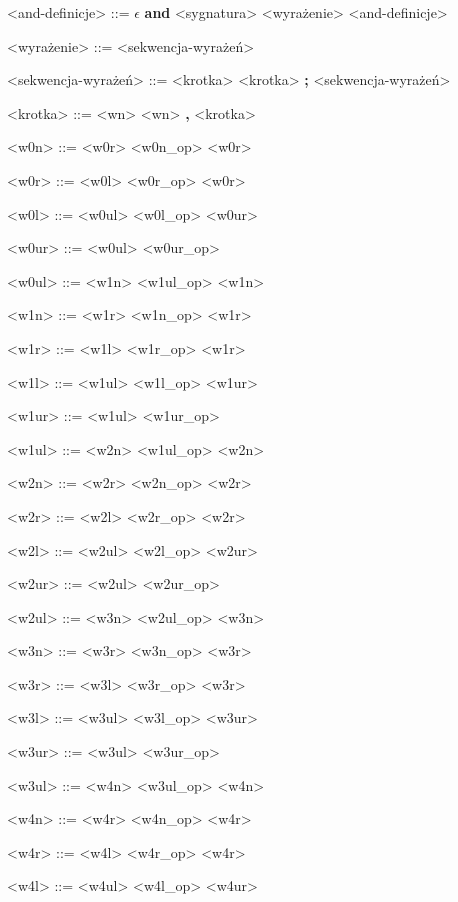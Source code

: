 \documentclass[12pt]{article}
\begin{document}
\begin{grammar}
<and-definicje> ::=
    $\epsilon$
    \alt \textbf{and} <sygnatura> <wyrażenie> <and-definicje>

<wyrażenie> ::=
    <sekwencja-wyrażeń>

<sekwencja-wyrażeń> ::=
    <krotka>
    \alt <krotka> \textbf{;} <sekwencja-wyrażeń>

<krotka> ::=
    <wn>
    \alt <wn> \textbf{,} <krotka>

<w0n> ::=
    <w0r>
     <w0n_op> <w0r>

<w0r> ::=
    <w0l>
     <w0r_op> <w0r>

<w0l> ::=
    <w0ul>
     <w0l_op> <w0ur>

<w0ur> ::=
    <w0ul>
     <w0ur_op> 
    
<w0ul> ::=
    <w1n>
    \alt <w1ul_op> <w1n>

<w1n> ::=
    <w1r>
     <w1n_op> <w1r>

<w1r> ::=
    <w1l>
     <w1r_op> <w1r>

<w1l> ::=
    <w1ul>
     <w1l_op> <w1ur>

<w1ur> ::=
    <w1ul>
     <w1ur_op> 
    
<w1ul> ::=
    <w2n>
    \alt <w1ul_op> <w2n>

<w2n> ::=
    <w2r>
     <w2n_op> <w2r>

<w2r> ::=
    <w2l>
     <w2r_op> <w2r>

<w2l> ::=
    <w2ul>
     <w2l_op> <w2ur>

<w2ur> ::=
    <w2ul>
     <w2ur_op> 
    
<w2ul> ::=
    <w3n>
    \alt <w2ul_op> <w3n>

    <w3n> ::=
    <w3r>
     <w3n_op> <w3r>

<w3r> ::=
    <w3l>
     <w3r_op> <w3r>

<w3l> ::=
    <w3ul>
     <w3l_op> <w3ur>

<w3ur> ::=
    <w3ul>
     <w3ur_op> 
    
<w3ul> ::=
    <w4n>
    \alt <w3ul_op> <w4n>

<w4n> ::=
    <w4r>
     <w4n_op> <w4r>

<w4r> ::=
    <w4l>
     <w4r_op> <w4r>

<w4l> ::=
    <w4ul>
     <w4l_op> <w4ur>


\end{grammar}
\end{document}
